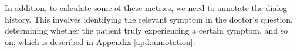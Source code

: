 In addition, to calculate some of these metrics, we need to annotate the dialog history. This involves identifying the relevant symptom in the doctor's question, determining whether the patient truly experiencing a certain symptom, and so on, which is described in Appendix \ref{apd:annotation}.





